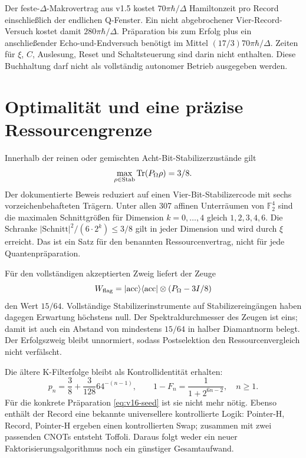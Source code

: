 Der feste-$\Delta$-Makrovertrag aus v1.5 kostet $70\pi\hbar/\Delta$ Hamiltonzeit pro Record einschließlich der endlichen Q-Fenster. Ein nicht abgebrochener Vier-Record-Versuch kostet damit $280\pi\hbar/\Delta$. Präparation bis zum Erfolg plus ein anschließender Echo-und-Endversuch benötigt im Mittel $(17/3)70\pi\hbar/\Delta$. Zeiten für $\xi$, $C$, Auslesung, Reset und Schaltsteuerung sind darin nicht enthalten. Diese Buchhaltung darf nicht als vollständig autonomer Betrieb ausgegeben werden.

\section{Optimalität und eine präzise Ressourcengrenze}
Innerhalb der reinen oder gemischten Acht-Bit-Stabilizerzustände gilt
\begin{equation}
\max_{\rho\in\mathrm{Stab}}\operatorname{Tr}(P_\Omega\rho)=3/8.
\end{equation}
Der dokumentierte Beweis reduziert auf einen Vier-Bit-Stabilizercode mit sechs vorzeichenbehafteten Trägern. Unter allen 307 affinen Unterräumen von $\mathbb F_2^4$ sind die maximalen Schnittgrößen für Dimension $k=0,\ldots,4$ gleich $1,2,3,4,6$. Die Schranke $|\mathrm{Schnitt}|^2/(6\cdot2^k)\le3/8$ gilt in jeder Dimension und wird durch $\xi$ erreicht. Das ist ein Satz für den benannten Ressourcenvertrag, nicht für jede Quantenpräparation.

Für den vollständigen akzeptierten Zweig liefert der Zeuge
\begin{equation}
W_{\mathrm{flag}}=\lvert\mathrm{acc}\rangle\langle\mathrm{acc}\rvert\otimes(P_\Omega-3I/8)
\end{equation}
den Wert $15/64$. Vollständige Stabilizerinstrumente auf Stabilizereingängen haben dagegen Erwartung höchstens null. Der Spektraldurchmesser des Zeugen ist eins; damit ist auch ein Abstand von mindestens $15/64$ in halber Diamantnorm belegt. Der Erfolgszweig bleibt unnormiert, sodass Postselektion den Ressourcenvergleich nicht verfälscht.

Die ältere K-Filterfolge bleibt als Kontrollidentität erhalten:
\begin{equation}
p_n=\frac38+\frac3{128}64^{-(n-1)},\qquad
1-F_n=\frac1{1+2^{6n-2}},\quad n\ge1.
\end{equation}
Für die konkrete Präparation \eqref{eq:v16-seed} ist sie nicht mehr nötig. Ebenso enthält der Record eine bekannte universellere kontrollierte Logik: Pointer-H, Record, Pointer-H ergeben einen kontrollierten Swap; zusammen mit zwei passenden CNOTs entsteht Toffoli. Daraus folgt weder ein neuer Faktorisierungsalgorithmus noch ein günstiger Gesamtaufwand.

